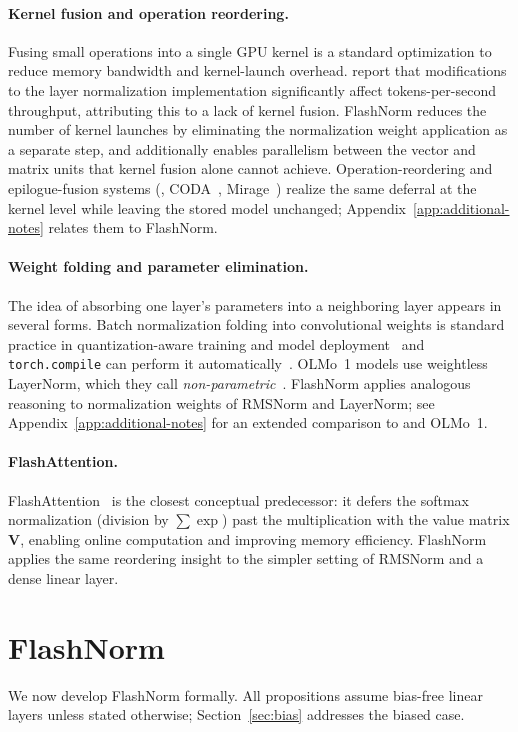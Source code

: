 \documentclass{article}
\begin{document}
\paragraph{Kernel fusion and operation reordering.}
Fusing small operations into a single GPU kernel is a standard optimization to
reduce memory bandwidth and kernel-launch overhead. \citet{openelm} report
that modifications to the layer normalization implementation significantly affect
tokens-per-second throughput, attributing this to a lack of kernel fusion. FlashNorm
reduces the number of kernel launches by eliminating the normalization weight
application as a separate step, and additionally enables parallelism between the
vector and matrix units that kernel fusion alone cannot achieve.
Operation-reordering and epilogue-fusion systems (\citet{opFusion}, CODA~\citep{coda},
Mirage~\citep{mirage}) realize the same deferral at the kernel level while leaving the
stored model unchanged; Appendix~\ref{app:additional-notes} relates them to FlashNorm.

\paragraph{Weight folding and parameter elimination.}
The idea of absorbing one layer's parameters into a neighboring layer appears in
several forms. Batch normalization folding into convolutional weights is standard
practice in quantization-aware training and model deployment~\citep{quantJacob, convBN}
and \verb+torch.compile+ can perform it automatically~\citep{torchCompileFuse}.
OLMo~1 models use weightless LayerNorm, which they call
\emph{non-parametric}~\citep{olmo2}. FlashNorm applies analogous reasoning to
normalization weights of RMSNorm and LayerNorm; see Appendix~\ref{app:additional-notes}
for an extended comparison to \citep{remove-norm2} and OLMo~1.

\paragraph{FlashAttention.}
FlashAttention~\citep{flash-attention} is the closest conceptual predecessor:
it defers the softmax normalization (division by $\sum \exp$) past the multiplication
with the value matrix $\mathbf{V}$, enabling online computation and improving memory
efficiency. FlashNorm applies the same reordering insight to the simpler setting of
RMSNorm and a dense linear layer.

\section{FlashNorm}
We now develop FlashNorm formally. All propositions assume bias-free linear layers
unless stated otherwise; Section~\ref{sec:bias} addresses the biased case.
\end{document}
